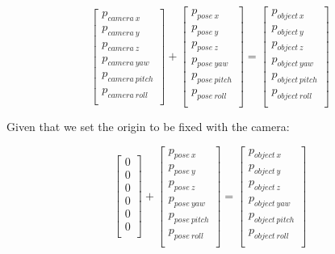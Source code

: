\documentclass{article}
\begin{document}
\[\begin{bmatrix}
    p_{camera\ x} \\
    p_{camera\ y} \\
    p_{camera\ z} \\
    p_{camera\ yaw} \\
    p_{camera\ pitch} \\
    p_{camera\ roll} \\
\end{bmatrix} + 
\begin{bmatrix}
    p_{pose\ x} \\
    p_{pose\ y} \\
    p_{pose\ z} \\
    p_{pose\ yaw} \\
    p_{pose\ pitch} \\
    p_{pose\ roll} \\
\end{bmatrix}
=
\begin{bmatrix}
    p_{object\ x} \\
    p_{object\ y} \\
    p_{object\ z} \\
    p_{object\ yaw} \\
    p_{object\ pitch} \\
    p_{object\ roll} \\
\end{bmatrix}\]

Given that we set the origin to be fixed with the camera:


\[\begin{bmatrix}
    0 \\
    0 \\
    0 \\
    0 \\
    0 \\
    0 \\
\end{bmatrix} + 
\begin{bmatrix}
    p_{pose\ x} \\
    p_{pose\ y} \\
    p_{pose\ z} \\
    p_{pose\ yaw} \\
    p_{pose\ pitch} \\
    p_{pose\ roll} \\
\end{bmatrix}
=
\begin{bmatrix}
    p_{object\ x} \\
    p_{object\ y} \\
    p_{object\ z} \\
    p_{object\ yaw} \\
    p_{object\ pitch} \\
    p_{object\ roll} \\
\end{bmatrix}\]
\end{document}
